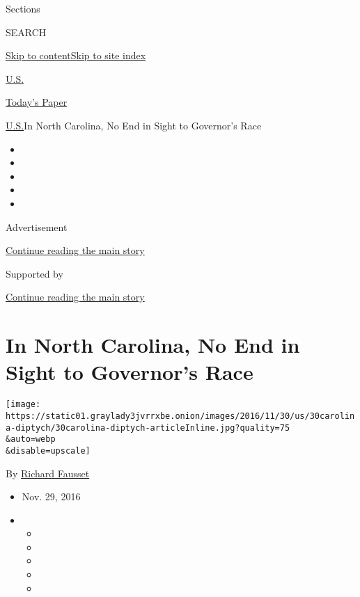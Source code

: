 Sections

SEARCH

\protect\hyperlink{site-content}{Skip to
content}\protect\hyperlink{site-index}{Skip to site index}

\href{https://www.nytimes3xbfgragh.onion/section/us}{U.S.}

\href{https://myaccount.nytimes3xbfgragh.onion/auth/login?response_type=cookie\&client_id=vi}{}

\href{https://www.nytimes3xbfgragh.onion/section/todayspaper}{Today's
Paper}

\href{/section/us}{U.S.}\textbar{}In North Carolina, No End in Sight to
Governor's Race

\begin{itemize}
\item
\item
\item
\item
\item
\end{itemize}

Advertisement

\protect\hyperlink{after-top}{Continue reading the main story}

Supported by

\protect\hyperlink{after-sponsor}{Continue reading the main story}

\hypertarget{in-north-carolina-no-end-in-sight-to-governors-race}{%
\section{In North Carolina, No End in Sight to Governor's
Race}\label{in-north-carolina-no-end-in-sight-to-governors-race}}

\texttt{[image: https://static01.graylady3jvrrxbe.onion/images/2016/11/30/us/30carolina-diptych/30carolina-diptych-articleInline.jpg?quality=75\\\&auto=webp\\\&disable=upscale]}

By \href{https://www.nytimes3xbfgragh.onion/by/richard-fausset}{Richard
Fausset}

\begin{itemize}
\item
  Nov. 29, 2016
\item
  \begin{itemize}
  \item
  \item
  \item
  \item
  \item
  \end{itemize}
\end{itemize}

